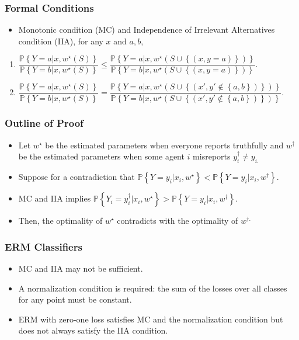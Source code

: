 \documentclass{beamer}
\begin{document}
\begin{frame} \frametitle{Formal Conditions}
\begin{itemize}
\item Monotonic condition (MC) and Independence of Irrelevant Alternatives condition (IIA), for any $x $ and $a , b, $
\end{itemize}
\begin{enumerate}
\item $\dfrac{\mathbb{P}\left\{Y = a | x, w^\star \left(S\right)\right\}}{\mathbb{P}\left\{Y = b | x, w^\star \left(S\right)\right\}} \leq  \dfrac{\mathbb{P}\left\{Y = a | x, w^\star \left(S \cup \left\{\left(x, y = a\right)\right\}\right)\right\}}{\mathbb{P}\left\{Y = b | x, w^\star \left(S \cup \left\{\left(x, y = a\right)\right\}\right)\right\}}.$
\item $\dfrac{\mathbb{P}\left\{Y = a | x, w^\star \left(S\right)\right\}}{\mathbb{P}\left\{Y = b | x, w^\star \left(S\right)\right\}} = \dfrac{\mathbb{P}\left\{Y = a | x, w^\star \left(S \cup \left\{\left(x', y' \notin \left\{a, b\right\}\right)\right\}\right)\right\}}{\mathbb{P}\left\{Y = b | x, w^\star \left(S \cup \left\{\left(x', y' \notin \left\{a, b\right\}\right)\right\}\right)\right\}}.$
\end{enumerate}

\end{frame}

\begin{frame} \frametitle{Outline of Proof}
\begin{itemize}
\item Let $w^\star $ be the estimated parameters when everyone reports truthfully and $w^{\dagger}$ be the estimated parameters when some agent $i $ misreports $y^{\dagger}_{i} \neq  y_{i.}$
\item Suppose for a contradiction that $\mathbb{P}\left\{Y = y_{i} | x_{i}, w^\star \right\} < \mathbb{P}\left\{Y = y_{i} | x_{i}, w^{\dagger}\right\}$.
\item MC and IIA implies $\mathbb{P}\left\{Y_{i} = y^{\dagger}_{i} | x_{i}, w^\star \right\} > \mathbb{P}\left\{Y = y_{i} | x_{i}, w^{\dagger}\right\}$.
\item Then, the optimality of $w^\star $ contradicts with the optimality of $w^{\dagger.}$
\end{itemize}
\end{frame}

\begin{frame} \frametitle{ERM Classifiers}
\begin{itemize}
\item MC and IIA may not be sufficient.
\item A normalization condition is required: the sum of the losses over all classes for any point must be constant.
\item ERM with zero-one loss satisfies MC and the normalization condition but does not always satisfy the IIA condition.
\end{itemize}
\end{frame}
\end{document}
